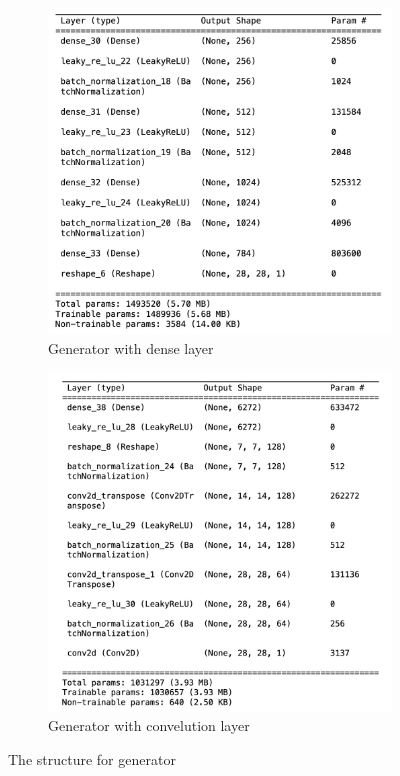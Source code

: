 \begin{figure}[H]
    \centering
    \begin{subfigure}[b]{0.45\linewidth}
        \centering
        \includegraphics[width=\linewidth]{./Images/generator_dense.jpg}
        \caption{Generator with dense layer}
        \label{fig:Dense}
    \end{subfigure}
    \hspace{0.05\linewidth}
    \begin{subfigure}[b]{0.45\linewidth}
        \centering
        \includegraphics[width=\linewidth]{./Images/generator_cnn.jpg}
        \caption{Generator with convelution layer}
        \label{fig:Conv2D Transpose}
    \end{subfigure}
    \caption{The structure for generator}
    \label{fig:combined}
\end{figure}


